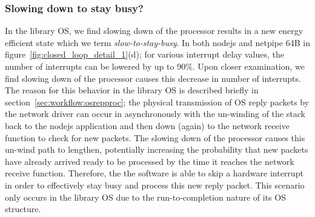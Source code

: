 \subsubsection{Slowing down to stay busy?}
\label{sec:closed_loop:slowtostaybusy}
In the library OS, we find slowing down of the processor results in a new energy efficient state which we term \textit{slow-to-stay-busy}. In both nodejs and netpipe 64B in figure~\ref{fig:closed_loop_detail_1}(d); for various interrupt delay values, the number of interrupts can be lowered by up to 90\%. Upon closer examination, we find slowing down of the processor causes this decrease in number of interrupts. The reason for this behavior in the library OS is described briefly in section~\ref{sec:workflow:osrepproc}; the physical transmission of OS reply packets by the network driver can occur in asynchronously with the un-winding of the stack back to the nodejs application and then down (again) to the network receive function to check for new packets. The slowing down of the processor causes this un-wind path to lengthen, potentially increasing the probability that new packets have already arrived ready to be processed by the time it reaches the network receive function. Therefore, the the software is able to skip a hardware interrupt in order to effectively stay busy and process this new reply packet. This scenario only occurs in the library OS due to the run-to-completion nature of its OS structure.





